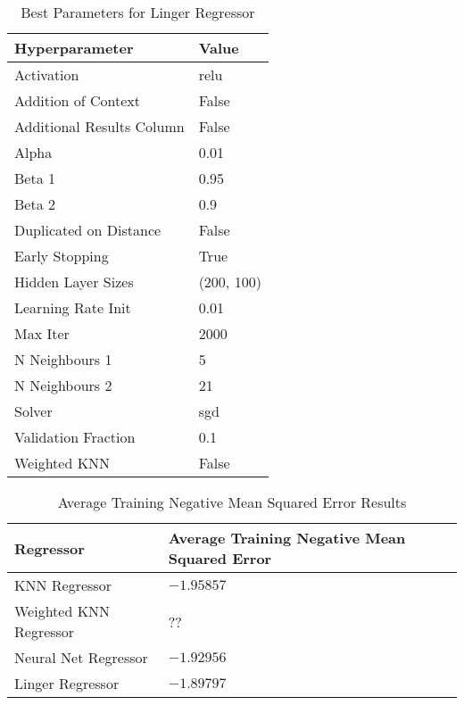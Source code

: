 \documentclass[a4paper, 12pt]{report}
\begin{document}
\begin{table}[H]
    \centering
    \caption{Best Parameters for Linger Regressor}
    \label{tab:best_parameters_linger_regressor_LR_Abalone}
    \begin{tabular}{|l|l|}
    \hline
    \textbf{Hyperparameter} & \textbf{Value} \\ \hline
    Activation & relu \\ \hline
    Addition of Context & False \\ \hline
    Additional Results Column & False \\ \hline
    Alpha & 0.01 \\ \hline
    Beta 1 & 0.95 \\ \hline
    Beta 2 & 0.9 \\ \hline
    Duplicated on Distance & False \\ \hline
    Early Stopping & True \\ \hline
    Hidden Layer Sizes & (200, 100) \\ \hline
    Learning Rate Init & 0.01 \\ \hline
    Max Iter & 2000 \\ \hline
    N Neighbours 1 & 5 \\ \hline
    N Neighbours 2 & 21 \\ \hline
    Solver & sgd \\ \hline
    Validation Fraction & 0.1 \\ \hline
    Weighted KNN & False \\ \hline
    \end{tabular}
\end{table}

\begin{table}[H]
    \centering
    \caption{Average Training Negative Mean Squared Error Results}
    \label{tab:average_results_train_Abalone}
    \begin{tabular}{|l|l|}
    \hline
    \textbf{Regressor} & \textbf{Average Training Negative Mean Squared Error} \\ \hline
    KNN Regressor &  $-1.95857$\\ \hline
    Weighted KNN Regressor &  ??\\ \hline
    Neural Net Regressor & $-1.92956$\\ \hline
    Linger Regressor & $-1.89797$\\ \hline
    \end{tabular}
\end{table}
\end{document}
